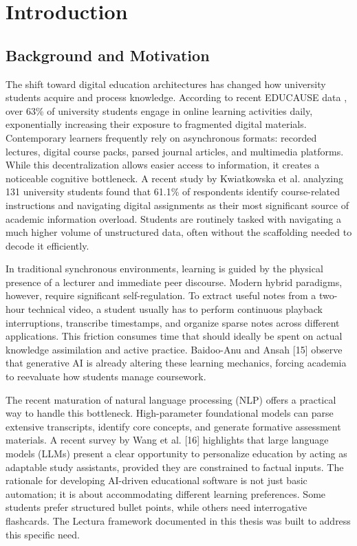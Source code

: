 \chapter{Introduction}
\label{chap:intro}

\section{Background and Motivation}
The shift toward digital education architectures has changed how university students acquire and process knowledge. According to recent EDUCAUSE data \cite{educause2022students}, over 63\% of university students engage in online learning activities daily, exponentially increasing their exposure to fragmented digital materials. Contemporary learners frequently rely on asynchronous formats: recorded lectures, digital course packs, parsed journal articles, and multimedia platforms. While this decentralization allows easier access to information, it creates a noticeable cognitive bottleneck. A recent study by Kwiatkowska et al. \cite{kwiatkowska2023information} analyzing 131 university students found that 61.1\% of respondents identify course-related instructions and navigating digital assignments as their most significant source of academic information overload. Students are routinely tasked with navigating a much higher volume of unstructured data, often without the scaffolding needed to decode it efficiently.

In traditional synchronous environments, learning is guided by the physical presence of a lecturer and immediate peer discourse. Modern hybrid paradigms, however, require significant self-regulation. To extract useful notes from a two-hour technical video, a student usually has to perform continuous playback interruptions, transcribe timestamps, and organize sparse notes across different applications. This friction consumes time that should ideally be spent on actual knowledge assimilation and active practice. Baidoo-Anu and Ansah [15] observe that generative AI is already altering these learning mechanics, forcing academia to reevaluate how students manage coursework. 

The recent maturation of natural language processing (NLP) offers a practical way to handle this bottleneck. High-parameter foundational models can parse extensive transcripts, identify core concepts, and generate formative assessment materials. A recent survey by Wang et al. [16] highlights that large language models (LLMs) present a clear opportunity to personalize education by acting as adaptable study assistants, provided they are constrained to factual inputs. The rationale for developing AI-driven educational software is not just basic automation; it is about accommodating different learning preferences. Some students prefer structured bullet points, while others need interrogative flashcards. The Lectura framework documented in this thesis was built to address this specific need.

